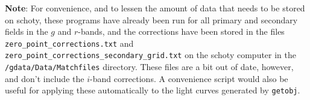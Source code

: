 \documentclass[11pt]{article}
\begin{document}
\vspace{0.2cm}
{\bf Note}: For convenience, and to lessen the amount of data that needs to be stored on schoty, these programs have already been run for all primary and secondary fields in the $g$ and $r$-bands, and the corrections have been stored in the files {\tt zero\_point\_corrections.txt} and {\tt zero\_point\_corrections\_secondary\_grid.txt} on the schoty computer in the {\tt /gdata/Data/Matchfiles} directory. These files are a bit out of date, however, and don't include the $i$-band corrections. A convenience script would also be useful for applying these automatically to the light curves generated by {\tt getobj}.
\end{document}
